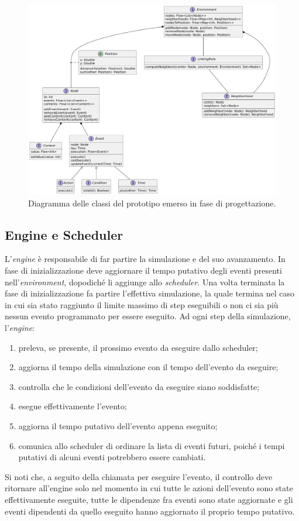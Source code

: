 \documentclass[12pt,a4paper,openright,twoside]{book}
\begin{document}
\begin{figure}
    \centering
    \includegraphics[width=\linewidth]{figures/design/design-class-diagram.pdf}
    \caption{Diagramma delle classi del prototipo emerso in fase di progettazione.}
    \label{fig:design-class-diagram}
\end{figure}

\subsection{Engine e Scheduler}
L'\textit{engine} è responsabile di far partire la simulazione e del suo avanzamento. In fase di inizializzazione deve aggiornare il tempo putativo degli eventi presenti nell'\textit{environment}, dopodiché li aggiunge allo \textit{scheduler}. 
Una volta terminata la fase di inizializzazione fa partire l'effettiva simulazione, la quale termina nel caso in cui sia stato raggiunto il limite massimo di step eseguibili o non ci sia più nessun evento programmato per essere eseguito. 
Ad ogni step della simulazione, l'\textit{engine}:
\begin{enumerate}
    \item preleva, se presente, il prossimo evento da eseguire dallo scheduler;
    \item aggiorna il tempo della simulazione con il tempo dell'evento da eseguire;
    \item controlla che le condizioni dell'evento da eseguire siano soddisfatte;
    \item esegue effettivamente l'evento;
    \item aggiorna il tempo putativo dell'evento appena eseguito;
    \item comunica allo scheduler di ordinare la lista di eventi futuri, poiché i tempi putativi di alcuni eventi potrebbero essere cambiati. 
\end{enumerate}
Si noti che, a seguito della chiamata per eseguire l'evento, il controllo deve ritornare all'engine solo nel momento in cui tutte le azioni dell'evento sono state effettivamente eseguite, tutte le dipendenze fra eventi sono state aggiornate e gli eventi dipendenti da quello eseguito hanno aggiornato il proprio tempo putativo. 
\end{document}
